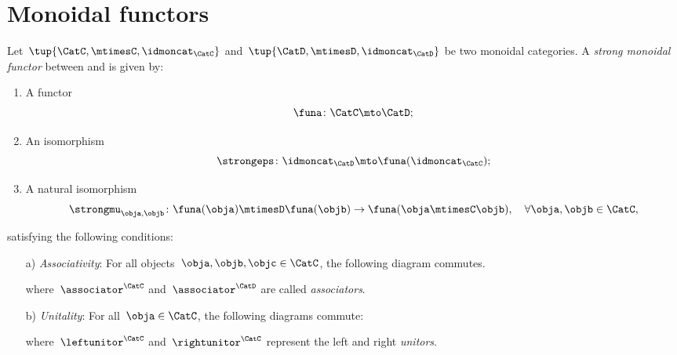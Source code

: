 

\section{Monoidal functors}
\label{sec:monoidal-functors}
\begin{ctdefinition}
  \label{def:strong-monoidal-functor}

  Let~$\tup{\CatC,\mtimesC,\idmoncat_{\CatC}}$ and~$\tup{\CatD,\mtimesD,\idmoncat_{\CatD}}$ be two monoidal categories. A \emph{strong monoidal functor} between \CatC and \CatD is given by:
  \begin{enumerate}
    \item A functor
    \begin{equation}
      \funa \colon \CatC \mto \CatD;
    \end{equation}
    \item An isomorphism
    \begin{equation}
      \strongeps\colon \idmoncat_{\CatD}\mto \funa(\idmoncat_{\CatC});
    \end{equation}
    \item A natural isomorphism
    \begin{equation}
      \strongmu_{\obja,\objb}\colon \funa(\obja)\mtimesD \funa(\objb) \to \funa(\obja \mtimesC \objb),\quad \forall \obja,\objb\in \CatC,
    \end{equation}
  \end{enumerate}
  satisfying the following conditions:
  \begin{enumerate}
    \item[a)] \emph{Associativity}: For all objects~$\obja,\objb,\objc\in \CatC$, the following diagram commutes.
    \begin{center}
    \end{center}
    where~$\associator^\CatC$ and~$\associator^\CatD$ are called \emph{associators}.
    \item[b)] \emph{Unitality}: For all~$\obja\in \CatC$, the following diagrams commute:
    \begin{center}
    \end{center}
    where~$\leftunitor^\CatC$ and~$\rightunitor^\CatC$ represent the left and right \emph{unitors}.
  \end{enumerate}
\end{ctdefinition}


